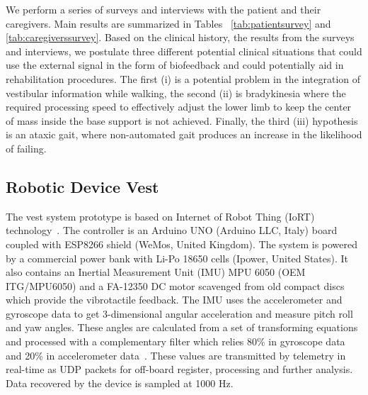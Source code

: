 \documentclass[conference]{IEEEtran}
\begin{document}
We perform a series of surveys and interviews with the patient and their caregivers.  Main results are summarized in 
Tables ~\ref{tab:patientsurvey} and \ref{tab:caregiverssurvey}.  Based on the clinical history, the results from the surveys and interviews, we postulate three different potential clinical situations that could use the external signal in the form of biofeedback and could potentially aid in rehabilitation procedures.  The first (i) is a potential problem in the integration of vestibular information while walking, the second (ii) is bradykinesia where the required processing speed to effectively adjust the lower limb to keep the center of mass inside the base support is not achieved.  Finally, the third (iii) hypothesis is an ataxic gait, where non-automated gait produces an increase in the likelihood of failing.


%

\subsection{Robotic Device Vest}
\label{sec:vest}

The vest system prototype is based on Internet of Robot Thing (IoRT) technology~\cite{Simoens.etal2018,Domingo.etal2012}. The controller is an Arduino UNO (Arduino LLC, Italy) board coupled with ESP8266 shield (WeMos, United Kingdom).  The system is powered by a commercial power bank with Li-Po 18650 cells (Ipower, United States). It also contains an Inertial Measurement Unit (IMU) MPU 6050 (OEM ITG/MPU6050) and a FA-12350 DC motor scavenged from old compact discs which provide the vibrotactile feedback.  The IMU uses the accelerometer and gyroscope data to get 3-dimensional angular acceleration and measure pitch roll and yaw angles. These angles are calculated from a set of transforming equations and processed with a complementary filter which relies 80\% in gyroscope data and 20\% in accelerometer data~\cite{Fetick.2022}. These values are transmitted by telemetry in real-time as UDP packets for off-board register, processing and further analysis. Data recovered by the device is sampled at 1000 Hz. 
\end{document}
